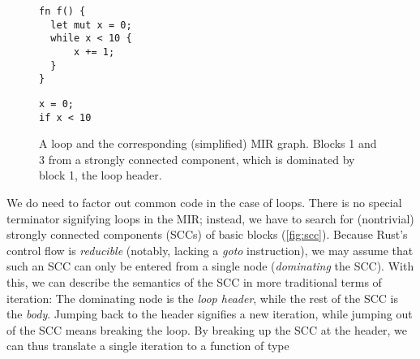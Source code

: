 \begin{figure}[!b]
\hspace{1cm}\begin{minipage}{0.4\textwidth}
  \begin{verbatim}
fn f() {
  let mut x = 0;
  while x < 10 {
      x += 1;
  }
}
  \end{verbatim}
\end{minipage}
\begin{minipage}{0.4\textwidth}
  \newsavebox{\mintedbox}
  \begin{lrbox}{\mintedbox}
    \begin{minipage}{1.8cm}
\begin{verbatim}
x = 0;
if x < 10
\end{verbatim}
    \end{minipage}
  \end{lrbox}
\end{minipage}

\caption{A  loop and the corresponding (simplified) MIR graph.
  Blocks 1 and 3 from a strongly connected component, which is dominated by
  block 1, the loop header.}
\label{fig:scc}

\end{figure}

We do need to factor out common code in the case of loops. There is no special
terminator signifying loops in the MIR; instead, we have to search for
(nontrivial) strongly connected components (SCCs) of basic blocks (\autoref{fig:scc}). Because Rust's
control flow is \emph{reducible} (notably, lacking a \emph{goto} instruction),
we may assume that such an SCC can only be entered from a single node
(\emph{dominating} the SCC). With this, we can describe the semantics of the SCC
in more traditional terms of iteration: The dominating node is the \emph{loop
  header}, while the rest of the SCC is the \emph{body}. Jumping back to the
header signifies a new iteration, while jumping out of the SCC means breaking
the loop. By breaking up the SCC at the header, we can thus translate a single
iteration to a function of type

